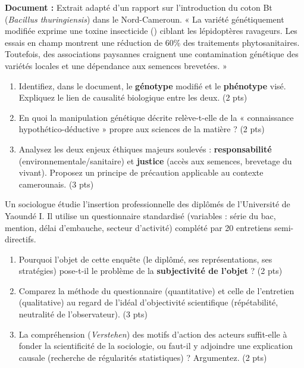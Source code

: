 \documentclass[11pt]{article}
\begin{document}
\begin{exercice}
\textbf{Document :} Extrait adapté d'un rapport sur l'introduction du coton Bt (\textit{Bacillus thuringiensis}) dans le Nord-Cameroun. « La variété génétiquement modifiée exprime une toxine insecticide () ciblant les lépidoptères ravageurs. Les essais en champ montrent une réduction de 60\% des traitements phytosanitaires. Toutefois, des associations paysannes craignent une contamination génétique des variétés locales et une dépendance aux semences brevetées. »
\begin{enumerate}
    \item Identifiez, dans le document, le \textbf{génotype} modifié et le \textbf{phénotype} visé. Expliquez le lien de causalité biologique entre les deux. (2 pts)
    \item En quoi la manipulation génétique décrite relève-t-elle de la « connaissance hypothético-déductive » propre aux sciences de la matière ? (2 pts)
    \item Analysez les deux enjeux éthiques majeurs soulevés : \textbf{responsabilité} (environnementale/sanitaire) et \textbf{justice} (accès aux semences, brevetage du vivant). Proposez un principe de précaution applicable au contexte camerounais. (3 pts)
\end{enumerate}
\end{exercice}

\begin{exercice}
Un sociologue étudie l'insertion professionnelle des diplômés de l'Université de Yaoundé I. Il utilise un questionnaire standardisé (variables : série du bac, mention, délai d'embauche, secteur d'activité) complété par 20 entretiens semi-directifs.
\begin{enumerate}
    \item Pourquoi l'objet de cette enquête (le diplômé, ses représentations, ses stratégies) pose-t-il le problème de la \textbf{subjectivité de l'objet} ? (2 pts)
    \item Comparez la méthode du questionnaire (quantitative) et celle de l'entretien (qualitative) au regard de l'idéal d'objectivité scientifique (répétabilité, neutralité de l'observateur). (3 pts)
    \item La compréhension (\textit{Verstehen}) des motifs d'action des acteurs suffit-elle à fonder la scientificité de la sociologie, ou faut-il y adjoindre une explication causale (recherche de régularités statistiques) ? Argumentez. (2 pts)
\end{enumerate}
\end{exercice}
\end{document}
